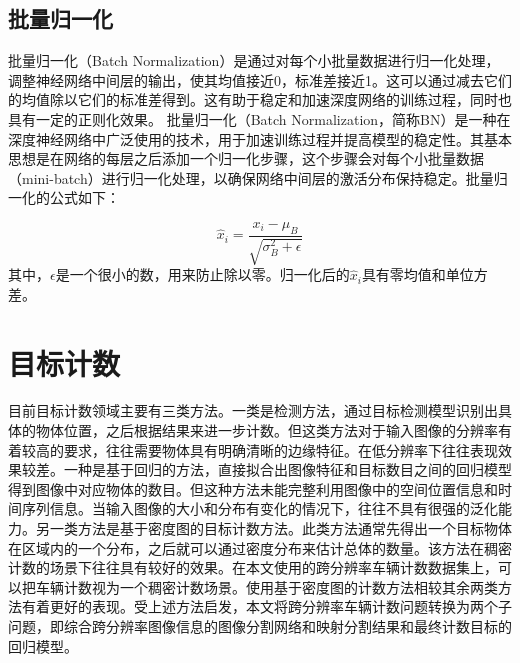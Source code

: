 \subsection{批量归一化}
批量归一化（Batch Normalization）\cite{bjorck2018understanding}是通过对每个小批量数据进行归一化处理，调整神经网络中间层的输出，使其均值接近0，标准差接近1。这可以通过减去它们的均值除以它们的标准差得到。这有助于稳定和加速深度网络的训练过程，同时也具有一定的正则化效果。
批量归一化（Batch Normalization，简称BN）是一种在深度神经网络中广泛使用的技术，用于加速训练过程并提高模型的稳定性。其基本思想是在网络的每层之后添加一个归一化步骤，这个步骤会对每个小批量数据（mini-batch）进行归一化处理，以确保网络中间层的激活分布保持稳定。批量归一化的公式如下：

\begin{equation}
  \hat{x}_i = \frac{x_i - \mu_B}{\sqrt{\sigma_B^2 + \epsilon}} 
\end{equation}
其中，$\epsilon$是一个很小的数，用来防止除以零。归一化后的\(\hat{x}_i\)具有零均值和单位方差。
\section{目标计数}
目前目标计数领域主要有三类方法。一类是检测方法\cite{girshick2014rich,girshick2015fast,ren2015faster,redmon2016you,redmon2017yolo9000,he2017mask}，通过目标检测模型识别出具体的物体位置，之后根据结果来进一步计数。但这类方法对于输入图像的分辨率有着较高的要求，往往需要物体具有明确清晰的边缘特征。在低分辨率下往往表现效果较差。一种是基于回归的方法\cite{2009BayesianPoissonRegressionCrowdCounting,2013MultisourceMultiscaleCountingExtremelyDenseCrowdImages,2009CrowdCountingUsingMultipleLocalFeatures}，直接拟合出图像特征和目标数目之间的回归模型得到图像中对应物体的数目。但这种方法未能完整利用图像中的空间位置信息和时间序列信息。当输入图像的大小和分布有变化的情况下，往往不具有很强的泛化能力。另一类方法是基于密度图的目标计数方法\cite{li2018csrnet,2016SingleImageCrowdCountingMultiColumnConvolutionalNeuralNetwork,2018CrowdCountingusingDeepRecurrentSpatialAwareNetwork,2018VehicleDetectionCountingHighResolutionAerialImagesUsingConvolutionalRegressionNeuralNetwork}。此类方法通常先得出一个目标物体在区域内的一个分布，之后就可以通过密度分布来估计总体的数量。该方法在稠密计数的场景下往往具有较好的效果。在本文使用的跨分辨率车辆计数数据集上，可以把车辆计数视为一个稠密计数场景。使用基于密度图的计数方法相较其余两类方法有着更好的表现。受上述方法启发，本文将跨分辨率车辆计数问题转换为两个子问题，即综合跨分辨率图像信息的图像分割网络和映射分割结果和最终计数目标的回归模型。

